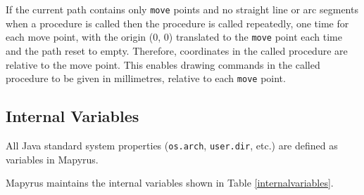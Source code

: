 If the current path contains only \texttt{move} points and no straight line or
arc segments when a procedure is called then the procedure is called
repeatedly, one time for each move point, with the origin (0, 0) translated to
the \texttt{move} point each time and the path reset to empty.  Therefore,
coordinates in the called procedure are relative to the move point.  This
enables drawing commands in the called procedure to be given in millimetres,
relative to each \texttt{move} point.

\subsection{Internal Variables}

All Java standard system properties (\texttt{os.arch}, \texttt{user.dir}, etc.)
are defined as variables in Mapyrus.

Mapyrus maintains the internal variables shown in Table \ref{internalvariables}.

